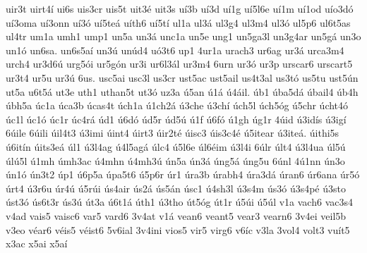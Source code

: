 {uir3t
uirt4í
ui6s
uis3cr
uis5t
uit3é
uit3s
uí3b
uí3d
uí1g
uí5l6e
uí1m
uí1od
uío3dó
uí3oma
uí3onn
uí3ó
uí5teá
uíth6
uí5tí
ul1a
ul3á
ul3g4
ul3m4
ul3ó
ul5p6
ul6t5as
ul4tr
um1a
umh1
ump1
un5a
un3á
unc1a
un5e
ung1
un5ga3l
un3g4ar
un5gá
un3o
un1ó
un6sa.
un6s5aí
un3ú
unúd4
uó3t6
up1
4ur1a
urach3
ur6ag
ur3á
urca3m4
urch4
ur3d6ú
urg5ói
ur5gón
ur3i
ur6l3ál
ur3m4
6urn
ur3ó
ur3p
urscar6
urscart5
ur3t4
ur5u
ur3ú
6us.
usc5ai
usc3l
us3cr
ust5ac
ust5ail
us4t3al
us3tó
us5tu
ust5ún
ut5a
u6t5á
ut3e
uth1
uthan5t
ut3ó
uz3a
ú5an
ú1á
ú4áil.
úb1
úba5dá
úbail4
úb4h
úbh5a
úc1a
úca3b
úcas4t
úch1a
ú1ch2á
ú3che
ú3chí
úch5l
úch5óg
ú5chr
úcht4ó
úc1l
úc1ó
úc1r
úc4rá
úd1
ú6dó
úd5r
úd5ú
ú1f
ú6fó
ú1gh
úg1r
4úid
ú3idís
ú3igí
6úile
6úili
úil4t3
ú3imi
úint4
úirt3
úir2té
úisc3
úis3c4é
ú5itear
ú3iteá.
úithi5s
ú6itín
úits3eá
úl1
ú3l4ag
ú4l5agá
úlc4
ú5l6e
úl6éim
ú3l4i
6úlr
últ4
ú3l4ua
úl5ú
úlú5l
ú1mh
úmh3ac
ú4mhn
ú4mh3ú
ún5a
ún3á
úng5á
úng5u
6únl
4ú1nn
ún3o
ún1ó
ún3t2
úp1
ú6p5a
úpa5t6
ú5p6r
úr1
úra3b
úrabh4
úra3dá
úran6
úr6ana
úr5ó
úrt4
ú3r6u
úr4ú
ú5rúi
ús4air
ús2á
ús5án
úsc1
ú4sh3l
ú3s4m
ús3ó
ú3s4pé
ú3sto
úst3ó
ús6t3r
ús3ú
út3a
ú6t1á
úth1
ú3tho
út5óg
út1r
ú5úi
ú5úl
v1a
vach6
vac3s4
v4ad
vais5
vaisc6
var5
vard6
3v4at
v1á
vean6
veant5
vear3
vearn6
3v4ei
veil5b
v3eo
véar6
véis5
véist6
5v6ial
3v4ini
vios5
vir5
virg6
v6íc
v3la
3vol4
volt3
vuít5
x3ac
x5ai
x5aí
}

